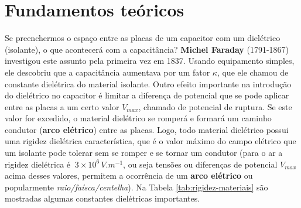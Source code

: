 \section{Fundamentos teóricos}
	
	Se preenchermos o espaço entre as placas de um capacitor com um dielétrico (isolante), o que acontecerá com a capacitância? \textbf{Michel Faraday} (1791-1867) investigou este assunto pela primeira vez em 1837. Usando equipamento simples, ele descobriu que a capacitância aumentava por um fator $\kappa$, que ele chamou de constante dielétrica do material isolante. Outro efeito importante na introdução do dielétrico no capacitor é limitar a diferença de potencial que se pode aplicar entre as placas a um certo valor ${V}_{max}$, chamado de potencial de ruptura. Se este valor for excedido, o material dielétrico se romperá e formará um caminho condutor ({\color{red}\textbf{arco elétrico}}) entre as placas. Logo, todo material dielétrico possui uma rigidez dielétrica característica, que é o valor máximo do campo elétrico que um isolante pode tolerar sem se romper e se tornar um condutor (para o ar a rigidez dielétrica é $~3\times10^{6} \,V.m^{-1}$, ou seja tensões ou diferenças de potencial ${V}_{max}$ acima desses valores, permitem a ocorrência de um \textbf{arco elétrico} ou popularmente \textit{raio/faísca/centelha}). Na Tabela \ref{tab:rigidez-materiais} são mostradas algumas constantes dielétricas importantes.
	
